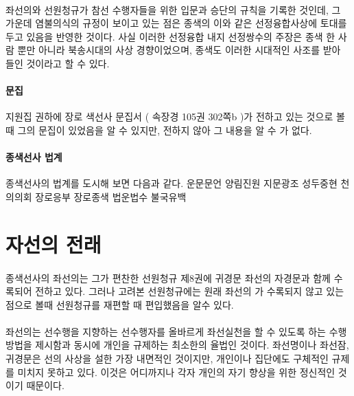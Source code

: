 \documentclass[12pt, a4paper, oneside]{book}
\let\stdsection\section
\renewcommand\section{\newpage\stdsection}
\begin{document}
\paragraph{}
좌선의와 선원청규가 참선 수행자들을 위한 입문과 승단의 규칙을 기록한 것인데, 
그 가운데 염불의식의 규정이 보이고 있는 점은 종색의 이와 같은 선정융합사상에 토대를 두고 있음을 반영한 것이다.
사실 이러한 선정융합 내지 선정쌍수의 주장은 종색 한 사람 뿐만 아니라 북송시대의 사상 경향이었으며,
종색도 이러한 시대적인 사조를 받아 들인 것이라고 할 수 있다.




\paragraph{문집}
지원집 권하에 장로 색선사 문집서 ( 속장경 105권 302쪽b )가 전하고 있는 것으로 볼때 그의 문집이 있었음을 알 수 있지만, 전하지 않아 그 내용을 알 수 가 없다.


\paragraph{종색선사 법계}
종색선사의 법계를 도시해 보면 다음과 같다.
운문문언
양림진원
지문광조
성두중현
천의의회
장로응부
장로종색
법운법수
불국유백




%
	\section{자선의 전래 }


\paragraph{}
종색선사의 좌선의는 그가 편찬한 선원청규 제8권에 귀경문 좌선의 자경문과 함께 수록되어 전하고 있다.
그러나 고려본 선원청규에는 원래 좌선의 가 수록되지 않고 있는 점으로 볼때 선원청규를 재편할 때 편입했음을 알수 있다.

\paragraph{}
좌선의는 선수행을 지향하는 선수행자를 올바르게 좌선실천을 할 수 있도록 하는 수행방법을 제시함과 동시에 개인을 규제하는 최소한의 율법인 것이다.
좌선명이나 좌선잠, 귀경문은 선의 사상을 설한 가장 내면적인 것이지만, 
개인이나 집단에도 구체적인 규제를 미치지 못하고 있다.
이것은 어디까지나 각자 개인의 자기 향상을 위한 정신적인 것이기 때문이다.
\end{document}
